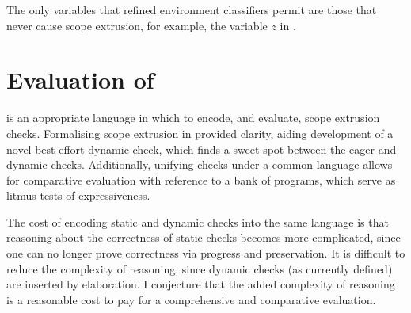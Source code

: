 The only variables that refined environment classifiers permit are those that never cause scope extrusion, for example, the variable $z$ in .



\section{Evaluation of \texorpdfstring{\sourceLang{}}{Lambda-Op-Quote-Splice}} \label{section:evaluation}
\sourceLang{} is an appropriate language in which to encode, and evaluate, scope extrusion checks. Formalising scope extrusion in \sourceLang{} provided clarity, aiding development of a novel best-effort dynamic check, which finds a sweet spot between the eager and dynamic checks. Additionally, unifying checks under a common language allows for comparative evaluation with reference to a bank of \sourceLang{} programs, which serve as litmus tests of expressiveness.

The cost of encoding static and dynamic checks into the same language is that reasoning about the correctness of static checks becomes more complicated, since one can no longer prove correctness via progress and preservation. It is difficult to reduce the complexity of reasoning, since dynamic checks (as currently defined) are inserted by elaboration. I conjecture that the added complexity of reasoning is a reasonable cost to pay for a comprehensive and comparative evaluation.


